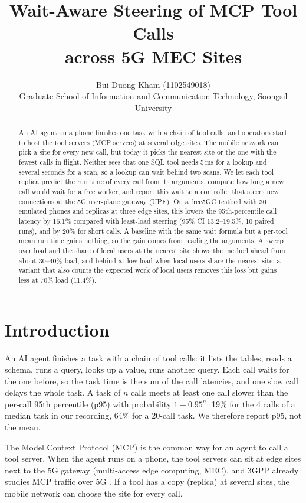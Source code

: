 \documentclass{article}
\title{Wait-Aware Steering of MCP Tool Calls\\across 5G MEC Sites}
\author{Bui Duong Kham (1102549018)\\
Graduate School of Information and Communication Technology, Soongsil University}
\newif\ifcoursecopy \coursecopytrue
\newif\ificlrstyle
\begin{document}
\maketitle
\ificlrstyle\ifcoursecopy\lhead{Term project, Machine Learning and AI, Fall 2026}\fi\fi

\begin{abstract}
An AI agent on a phone finishes one task with a chain of tool calls, and operators start
to host the tool servers (MCP servers) at several edge sites. The mobile network can pick
a site for every new call, but today it picks the nearest site or the one with the fewest
calls in flight. Neither sees that one SQL tool needs 5\,ms for a lookup and several
seconds for a scan, so a lookup can wait behind two scans. We let each tool replica
predict the run time of every call from its arguments, compute how long a new call would
wait for a free worker, and report this wait to a controller that steers new connections
at the 5G user-plane gateway (UPF). On a free5GC testbed with 30 emulated phones and
replicas at three edge sites, this lowers the 95th-percentile call latency by 16.1\%
compared with least-load steering (95\% CI 13.2--19.5\%, 10 paired runs), and by 20\%
for short calls. A baseline with the same wait formula but a per-tool mean run time gains
nothing, so the gain comes from reading the arguments. A sweep over load and the share of
local users at the nearest site shows the method ahead from about 30--40\% load, and
behind at low load when local users share the nearest site; a variant that also counts
the expected work of local users removes this loss but gains less at 70\% load (11.4\%).
\end{abstract}

\section{Introduction}
An AI agent finishes a task with a chain of tool calls: it lists the tables, reads a schema,
runs a query, looks up a value, runs another query. Each call waits for the one before, so
the task time is the sum of the call latencies, and one slow call delays the whole task.
A task of $n$ calls meets at least one call slower than the per-call 95th percentile (p95)
with probability $1-0.95^{n}$: 19\% for the 4 calls of a median task in our recording, 64\%
for a 20-call task. We therefore report p95, not the mean.

The Model Context Protocol (MCP) \citep{mcp_spec} is the common way for an agent to call a
tool server. When the agent runs on a phone, the tool servers can sit at edge sites next to
the 5G gateway (multi-access edge computing, MEC), and 3GPP already studies MCP traffic over
5G \citep{tr26870}. If a tool has a copy (replica) at several sites, the mobile network can
choose the site for every call.
\end{document}
